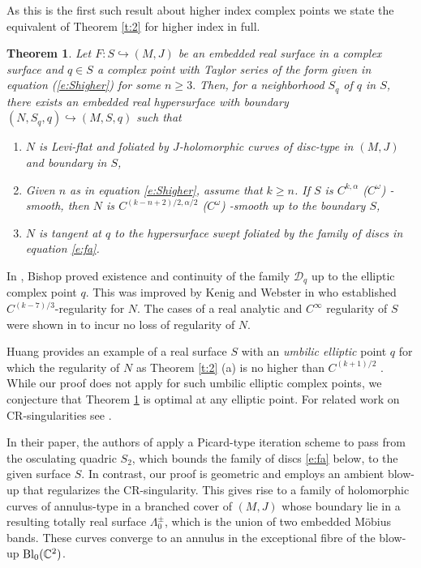 \documentclass{amsart}
\newtheorem{theorem}{Theorem}
\begin{document}
As this is the first such result about higher index complex points we state the equivalent of Theorem \ref{t:2} for higher index in full. 
\\
\begin{theorem}\label{t:3}
Let $F:S\hookrightarrow (M,J)$ be an embedded real surface in a complex surface and $ q\in S$ a complex point with Taylor series of the form given in equation (\ref{e:Shigher}) for some $n \ge 3.$  Then, for a neighborhood $S_ q$ of $q$ in $S$, there exists an embedded real hypersurface with boundary $ (N,S_q,q)\hookrightarrow (M,S,q)$ such that
\begin{enumerate}
\item[(a)] $N$ is Levi-flat and foliated by $J$-holomorphic curves of disc-type in $(M,J)$ and boundary in $  S$,
\item[(b)] Given $n$ as in equation \eqref{e:Shigher}, assume that $k\ge n$. If $S$ is $C^{k,\alpha}$ ($C^\omega$) -smooth, then $N$ is 
$C^{(k-n + 2)/2,\alpha/ 2}$  ($C^\omega$) -smooth  up to the boundary 
$S$,
\item[(c)] $N$ is tangent at $q$ to the hypersurface swept foliated by the family of discs in equation \eqref{e:fa}.
\end{enumerate}
\end{theorem}

In \cite{B}, Bishop  proved existence and continuity of the family $\mathcal{D}_q $ up to the elliptic complex point $q$. This was improved by Kenig and Webster in \cite{KW}   who established $C^{(k-7)/3}$-regularity for $N$. The cases of a real analytic and $C^\infty$ regularity of $S$ were shown in \cite{Hu} to incur no loss of regularity of $N$.

Huang provides an example of a real surface $S$ with an {\it umbilic elliptic}  point $q$ for which the regularity of $N$ as Theorem \ref{t:2} (a) is no higher than $C^{(k+1)/2}$ \cite{Hu}. While our proof does not apply for such umbilic elliptic complex points, we conjecture that Theorem \ref{t:3} is optimal at any elliptic point. For related work on CR-singularities see \cite{FH18} \cite{HY16} \cite{HY17} \cite{W95}.

In their paper, the authors of \cite{KW} apply a Picard-type iteration scheme to pass from the osculating quadric $S_2$, which bounds the family of discs \eqref{e:fa} below, to the given surface $S$. In contrast, our proof is geometric and employs an ambient blow-up that regularizes the CR-singularity. This gives rise to a family of holomorphic curves of annulus-type in a branched cover  of $(M,J)$ whose boundary lie in a resulting totally real surface $\Lambda_0^{\pm}$, which is the union of two embedded M\"obius bands. These curves converge to an annulus in the exceptional fibre of the blow-up ${\rm Bl}_0(\mathbb{C}^2)$.
\end{document}
